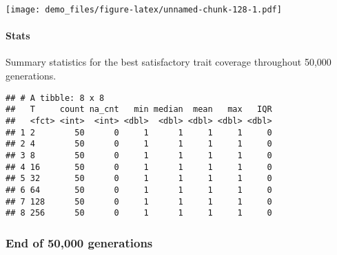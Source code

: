 \documentclass[]{book}
\newenvironment{Shaded}{\begin{snugshade}}{\end{snugshade}}
\newcommand{\DataTypeTok}[1]{\textcolor[rgb]{0.13,0.29,0.53}{#1}}
\newcommand{\KeywordTok}[1]{\textcolor[rgb]{0.13,0.29,0.53}{\textbf{#1}}}
\newcommand{\NormalTok}[1]{#1}
\newcommand{\OperatorTok}[1]{\textcolor[rgb]{0.81,0.36,0.00}{\textbf{#1}}}
\newcommand{\OtherTok}[1]{\textcolor[rgb]{0.56,0.35,0.01}{#1}}
\newcommand{\StringTok}[1]{\textcolor[rgb]{0.31,0.60,0.02}{#1}}
\let\oldparagraph\paragraph
\renewcommand{\paragraph}[1]{\oldparagraph{#1}\mbox{}}
\begin{document}
\texttt{[image: demo\_files/figure-latex/unnamed-chunk-128-1.pdf]}

\hypertarget{stats-23}{%
\paragraph{Stats}\label{stats-23}}

Summary statistics for the best satisfactory trait coverage throughout 50,000 generations.

\begin{Shaded}
\end{Shaded}

\begin{verbatim}
## # A tibble: 8 x 8
##   T     count na_cnt   min median  mean   max   IQR
##   <fct> <int>  <int> <dbl>  <dbl> <dbl> <dbl> <dbl>
## 1 2        50      0     1      1     1     1     0
## 2 4        50      0     1      1     1     1     0
## 3 8        50      0     1      1     1     1     0
## 4 16       50      0     1      1     1     1     0
## 5 32       50      0     1      1     1     1     0
## 6 64       50      0     1      1     1     1     0
## 7 128      50      0     1      1     1     1     0
## 8 256      50      0     1      1     1     1     0
\end{verbatim}

\hypertarget{end-of-50000-generations-10}{%
\subsubsection{End of 50,000 generations}\label{end-of-50000-generations-10}}
\end{document}
